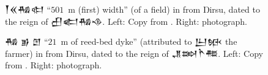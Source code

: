 \documentclass[10pt, a4paper, twoside]{article}
\newcommand\sevenAshTenu{{\symbol{"1246F}}}
\newcommand{\obverse}{obv.}
\begin{document}
\begin{figure}[H]
  \begin{center}
  \end{center}
  \caption[]{{\xsuxfont 𒐕𒎙\footnotemark\sevenAshTenu{}𒄀𒊕} ``$501$~m (first) width'' (of a field) in \cite[\obverse~3~7]{P221254} from Ŋirsu, dated to the reign of {\xsuxfont 𒌷𒅗𒄀𒈾}.
  Left: Copy from \cite{AllottedelaFuÿe1920}.
  Right: \cite{CDLI} photograph.}\label{figSevenReedsFirst}
\end{figure}
\begin{figure}[H]
  \begin{center}
  \end{center}
  \caption{{\xsuxfont \sevenAshTenu{}𒄀 𒂊 𒆹} ``$21$~m of reed-bed dyke'' (attributed to {\xsuxfont 𒌨𒁮} the farmer) in \cite[\obverse~1~1]{P221266} from Ŋirsu, dated to the reign of {\xsuxfont 𒂗𒇷𒋻𒍣}. Left: Copy from \cite{AllottedelaFuÿe1920}.
  Right: \cite{LouvreCollections} photograph.}\label{figSevenReedsLast}
\end{figure}
\end{document}
